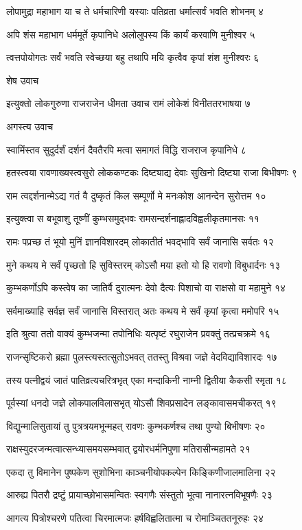 लोपामुद्रा महाभाग या च ते धर्मचारिणी
यस्याः पतिव्रता धर्मात्सर्वं भवति शोभनम् ४

अपि शंस महाभाग धर्ममूर्ते कृपानिधे
अलोलुपस्य किं कार्यं करवाणि मुनीश्वर ५

त्वत्तपोयोगतः सर्वं भवति स्वेच्छया बहु
तथापि मयि कृत्वैव कृपां शंश मुनीश्वरः ६

शेष उवाच

इत्युक्तो लोकगुरुणा राजराजेन धीमता
उवाच रामं लोकेशं विनीततरभाषया ७

अगस्त्य उवाच

स्वामिंस्तव सुदुर्दर्शं दर्शनं दैवतैरपि
मत्वा समागतं विद्धि राजराज कृपानिधे ८

हतस्त्वया रावणाख्यस्त्वसुरो लोककण्टकः
दिष्ट्याद्य देवाः सुखिनो दिष्ट्या राजा बिभीषणः ९

राम त्वद्दर्शनान्मेऽद्य गतं वै दुष्कृतं किल
सम्पूर्णो मे मनःकोश आनन्देन सुरोत्तम १०

इत्युक्त्वा स बभूवाशु तूष्णीं कुम्भसमुद्भवः
रामसन्दर्शनाह्लादविह्वलीकृतमानसः ११

रामः पप्रच्छ तं भूयो मुनिं ज्ञानविशारदम्
लोकातीतं भवद्भावि सर्वं जानासि सर्वतः १२

मुने कथय मे सर्वं पृच्छतो हि सुविस्तरम्
कोऽसौ मया हतो यो हि रावणो विबुधार्दनः १३

कुम्भकर्णोऽपि कस्त्वेष का जातिर्वै दुरात्मनः
देवो दैत्यः पिशाचो वा राक्षसो वा महामुने १४

सर्वमाख्याहि सर्वज्ञ सर्वं जानासि विस्तरात्
अतः कथय मे सर्वं कृपां कृत्वा ममोपरि १५

इति श्रुत्वा ततो वाक्यं कुम्भजन्मा तपोनिधिः
यत्पृष्टं रघुराजेन प्रवक्तुं तत्प्रचक्रमे १६

राजन्सृष्टिकरो ब्रह्मा पुलस्त्यस्तत्सुतोऽभवत्
ततस्तु विश्रवा जज्ञे वेदविद्याविशारदः १७

तस्य पत्नीद्वयं जातं पातिव्रत्यचरित्रभृत्
एका मन्दाकिनी नाम्नी द्वितीया कैकसी स्मृता १८

पूर्वस्यां धनदो जज्ञे लोकपालविलासभृत्
योऽसौ शिवप्रसादेन लङ्कावासमचीकरत् १९

विद्युन्मालिसुतायां तु पुत्रत्रयमभून्महत्
रावणः कुम्भकर्णश्च तथा पुण्यो बिभीषणः २०

राक्षस्युदरजन्मत्वात्सन्ध्यासमयसम्भवात्
द्वयोरधर्मनिपुणा मतिरासीन्महामते २१

एकदा तु विमानेन पुष्पकेण सुशोभिना
काञ्चनीयोपकल्पेन किङ्किणीजालमालिना २२

आरुह्य पितरौ द्रष्टुं प्रायाच्छोभासमन्वितः
स्वगणैः संस्तुतो भूत्वा नानारत्नविभूषणैः २३

आगत्य पित्रोश्चरणे पतित्वा चिरमात्मजः
हर्षविह्वलितात्मा च रोमाञ्चिततनूरुहः २४

